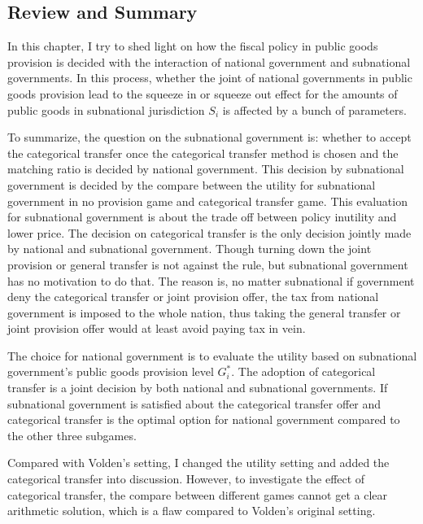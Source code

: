 \begin{itemize}
\section{Review and Summary}
In this chapter, I try to shed light on how the fiscal policy in public goods provision is decided with the interaction of national government and subnational governments. In this process, whether the joint of national governments in public goods provision lead to the squeeze in or squeeze out effect for the amounts of public goods in subnational jurisdiction $S_i$ is affected by a bunch of parameters.

To summarize, the question on the subnational government is: whether to accept the categorical transfer once the categorical transfer method is chosen and the matching ratio is decided by national government. This decision by subnational government is decided by the compare between the utility for subnational government in no provision game and categorical transfer game. This evaluation for subnational government is about the trade off between policy inutility and lower price. The decision on categorical transfer is the only decision jointly made by national and subnational government. Though turning down the joint provision or general transfer is not against the rule, but subnational government has no motivation to do that. The reason is, no matter subnational if government deny the categorical transfer or joint provision offer, the tax from national government is imposed to the whole nation, thus taking the general transfer or joint provision offer would at least avoid paying tax in vein.

The choice for national government is to evaluate the utility based on subnational government's public goods provision level $G_i^*$. The adoption of categorical transfer is a joint decision by both national and subnational governments. If subnational government is satisfied about the categorical transfer offer and categorical transfer is the optimal option for national government compared to the other three subgames.

Compared with Volden's setting, I changed the utility setting and added the categorical transfer into discussion. However, to investigate the effect of categorical transfer, the compare between different games cannot get a clear arithmetic solution, which is a flaw compared to Volden's original setting.


\end{itemize}
